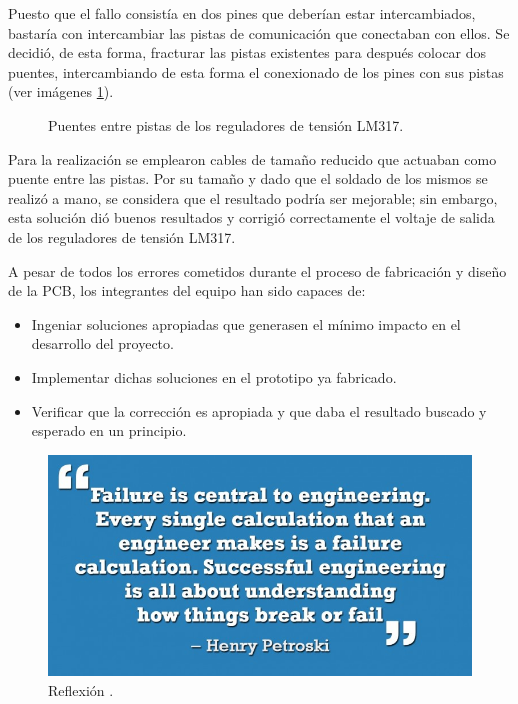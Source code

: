 \begin{itemize}
    Puesto que el fallo consistía en dos pines que deberían estar intercambiados, bastaría con intercambiar las pistas de comunicación que conectaban con ellos. Se decidió, de esta forma, fracturar las pistas existentes para después colocar dos puentes, intercambiando de esta forma el conexionado de los pines con sus pistas (ver imágenes \ref{fig:puentes}).
    
    \begin{figure}[H]
    \centering
    \hfill
    \caption{Puentes entre pistas de los reguladores de tensión LM317.}
    \label{fig:puentes}
    \end{figure}
    
    Para la realización se emplearon cables de tamaño reducido que actuaban como puente entre las pistas. Por su tamaño y dado que el soldado de los mismos se realizó a mano, se considera que el resultado podría ser mejorable; sin embargo, esta solución dió buenos resultados y corrigió correctamente el voltaje de salida de los reguladores de tensión LM317.
    
\end{itemize}

A pesar de todos los errores cometidos durante el proceso de fabricación y diseño de la \ac{PCB}, los integrantes del equipo han sido capaces de: 

\begin{itemize}
    \item Ingeniar soluciones apropiadas que generasen el mínimo impacto en el desarrollo del proyecto.
    \item Implementar dichas soluciones en el prototipo ya fabricado.
    \item Verificar que la corrección es apropiada y que daba el resultado buscado y esperado en un principio.
\end{itemize}

 \begin{figure}[H]
    \centering 
    \includegraphics[width=0.5\linewidth]{pictures/Quote.jpg}
    \caption{Reflexión \cite{noauthor_10_2018}.}
 \end{figure}


